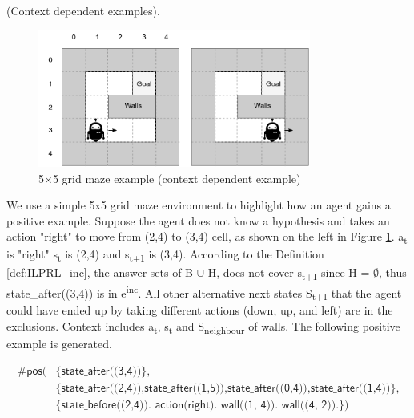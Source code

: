 \begin{examp} \normalfont (Context dependent examples).

\begin{figure}[!htb]
\centering
\includegraphics[width=0.8\textwidth]{./figures/pipeline_example1}
\caption{5$\times$5 grid maze example (context dependent example)}
\label{example_pos_example}
\end{figure}

We use a simple 5x5 grid maze environment to highlight how an agent gains a positive example.
Suppose the agent does not know a hypothesis and takes an action "right" to move from (2,4) to (3,4) cell, as shown on the left in Figure \ref{example_pos_example}.
a\textsubscript{t} is "right" s\textsubscript{t} is (2,4) and s\textsubscript{t+1} is (3,4).
According to the Definition \ref{def:ILPRL_inc}, the answer sets of B $\cup$ H, does not cover s\textsubscript{t+1} since H = $\emptyset$, thus \textsf{state\_after((3,4))} is in e\textsuperscript{inc}.
All other alternative next states S\textsubscript{t+1} that the agent could have ended up by taking different actions
(down, up, and left) are in the exclusions.
Context includes a\textsubscript{t}, s\textsubscript{t} and S\textsubscript{neighbour} of walls.
The following positive example is generated.

\begin{equation}
\begin{split}
    \textsf{\#pos(} & \textsf{\{state\_after((3,4))\},}\\
                    & \textsf{\{state\_after((2,4)),state\_after((1,5)),state\_after((0,4)),state\_after((1,4))\},} \\
    & \textsf{\{state\_before((2,4)). action(right). wall((1, 4)). wall((4, 2)).\})}
\end{split}
\end{equation}


\end{examp}
